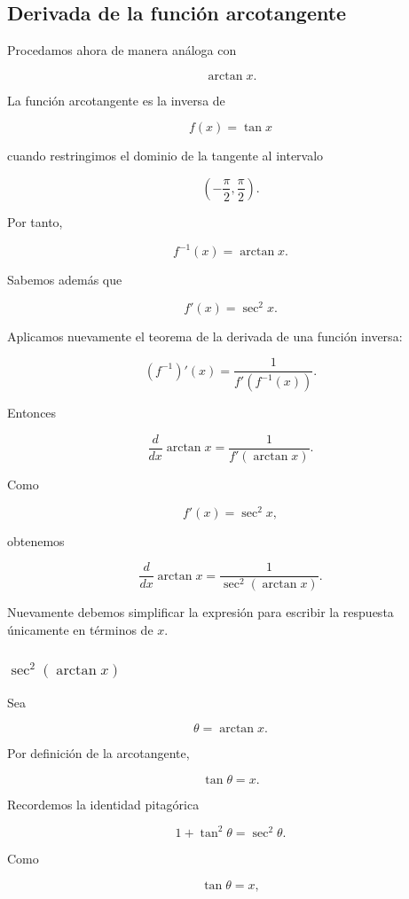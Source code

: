 \documentclass[12pt]{article}
\theoremstyle{definition}
\theoremstyle{remark}
\begin{document}
\subsection*{Derivada de la función arcotangente}

Procedamos ahora de manera análoga con

\[
\arctan x.
\]

La función arcotangente es la inversa de

\[
f(x)=\tan x
\]

cuando restringimos el dominio de la tangente al intervalo

\[
\left(-\frac{\pi}{2},\frac{\pi}{2}\right).
\]

Por tanto,

\[
f^{-1}(x)=\arctan x.
\]

Sabemos además que

\[
f'(x)=\sec^2x.
\]

Aplicamos nuevamente el teorema de la derivada de una función inversa:

\[
(f^{-1})'(x)
=
\frac{1}{f'(f^{-1}(x))}.
\]

Entonces

\[
\frac{d}{dx}\arctan x
=
\frac{1}{f'(\arctan x)}.
\]

Como

\[
f'(x)=\sec^2x,
\]

obtenemos

\[
\boxed{
\frac{d}{dx}\arctan x
=
\frac{1}{\sec^2(\arctan x)}.
}
\]

Nuevamente debemos simplificar la expresión para escribir la respuesta
únicamente en términos de $x$.

\subsubsection*{ $\sec^2(\arctan x)$}

Sea

\[
\theta=\arctan x.
\]

Por definición de la arcotangente,

\[
\tan\theta=x.
\]

Recordemos la identidad pitagórica

\[
1+\tan^2\theta=\sec^2\theta.
\]

Como

\[
\tan\theta=x,
\]
\end{document}
